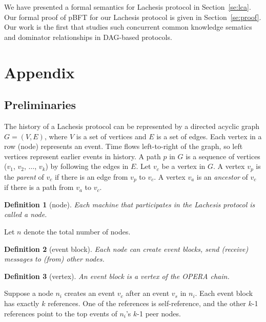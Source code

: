 \documentclass{article}
\newtheorem{defn}{Definition}[section]
\begin{document}
We have presented a formal semantics for Lachesis protocol in Section~\ref{se:lca}.
Our formal proof of pBFT for our Lachesis protocol is given in Section~\ref{se:proof}.  Our work is the first that studies such concurrent common knowledge sematics~\cite{cck92} and dominator relationships in DAG-based protocols.

\newpage
\section{Appendix}\label{se:appendix}


\subsection{Preliminaries}
The history of a Lachesis protocol can be represented by a directed acyclic graph $G=(V, E)$, where $V$ is a set of vertices and $E$ is a set of edges. Each vertex in a row (node) represents an event. Time flows left-to-right of the graph, so left vertices represent earlier events in history.
A path $p$ in $G$ is a sequence  of vertices ($v_1$, $v_2$, $\dots$, $v_k$) by following the edges in $E$.
Let $v_c$ be a vertex in $G$.
A vertex $v_p$ is the \emph{parent} of $v_c$ if there is an edge from $v_p$ to $v_c$.
A vertex $v_a$ is an \emph{ancestor} of $v_c$ if there is a path from $v_a$ to $v_c$.

\begin{defn}[node]
	Each machine that participates in the Lachesis protocol is called a node. \end{defn}



Let $n$ denote the total number of nodes.

\begin{defn}[event block]
	Each node can create event blocks, send (receive) messages to (from) other nodes.
\end{defn}

\begin{defn}[vertex]
	An event block is a vertex of the OPERA chain.
\end{defn}



Suppose a node $n_i$ creates an event $v_c$ after an event $v_s$ in $n_i$.  Each event block has exactly $k$ references. One of the references is self-reference, and the other $k$-1 references point to the top events of $n_i$'s $k$-1 peer nodes.
\end{document}
